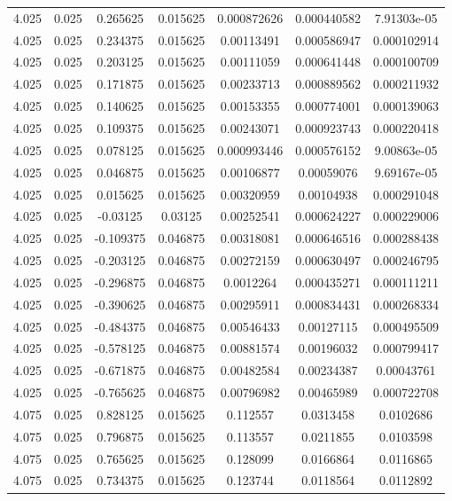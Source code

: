 \begin{flushleft}
\begin{longtable}{ccccccc}
4.025 & 0.025 & 0.265625 & 0.015625 & 0.000872626 & 0.000440582 & 7.91303e-05  \\ 
4.025 & 0.025 & 0.234375 & 0.015625 & 0.00113491 & 0.000586947 & 0.000102914  \\ 
4.025 & 0.025 & 0.203125 & 0.015625 & 0.00111059 & 0.000641448 & 0.000100709  \\ 
4.025 & 0.025 & 0.171875 & 0.015625 & 0.00233713 & 0.000889562 & 0.000211932  \\ 
4.025 & 0.025 & 0.140625 & 0.015625 & 0.00153355 & 0.000774001 & 0.000139063  \\ 
4.025 & 0.025 & 0.109375 & 0.015625 & 0.00243071 & 0.000923743 & 0.000220418  \\ 
4.025 & 0.025 & 0.078125 & 0.015625 & 0.000993446 & 0.000576152 & 9.00863e-05  \\ 
4.025 & 0.025 & 0.046875 & 0.015625 & 0.00106877 & 0.00059076 & 9.69167e-05  \\ 
4.025 & 0.025 & 0.015625 & 0.015625 & 0.00320959 & 0.00104938 & 0.000291048  \\ 
4.025 & 0.025 & -0.03125 & 0.03125 & 0.00252541 & 0.000624227 & 0.000229006  \\ 
4.025 & 0.025 & -0.109375 & 0.046875 & 0.00318081 & 0.000646516 & 0.000288438  \\ 
4.025 & 0.025 & -0.203125 & 0.046875 & 0.00272159 & 0.000630497 & 0.000246795  \\ 
4.025 & 0.025 & -0.296875 & 0.046875 & 0.0012264 & 0.000435271 & 0.000111211  \\ 
4.025 & 0.025 & -0.390625 & 0.046875 & 0.00295911 & 0.000834431 & 0.000268334  \\ 
4.025 & 0.025 & -0.484375 & 0.046875 & 0.00546433 & 0.00127115 & 0.000495509  \\ 
4.025 & 0.025 & -0.578125 & 0.046875 & 0.00881574 & 0.00196032 & 0.000799417  \\ 
4.025 & 0.025 & -0.671875 & 0.046875 & 0.00482584 & 0.00234387 & 0.00043761  \\ 
4.025 & 0.025 & -0.765625 & 0.046875 & 0.00796982 & 0.00465989 & 0.000722708  \\ 
4.075 & 0.025 & 0.828125 & 0.015625 & 0.112557 & 0.0313458 & 0.0102686  \\ 
4.075 & 0.025 & 0.796875 & 0.015625 & 0.113557 & 0.0211855 & 0.0103598  \\ 
4.075 & 0.025 & 0.765625 & 0.015625 & 0.128099 & 0.0166864 & 0.0116865  \\ 
4.075 & 0.025 & 0.734375 & 0.015625 & 0.123744 & 0.0118564 & 0.0112892  \\ 

\end{longtable}
\end{flushleft}
